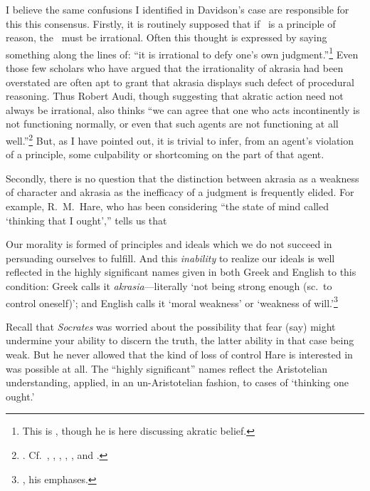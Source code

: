 \documentclass[11pt,letterpaper,oneside]{amsart}
\begin{document}
I believe the same confusions I identified in Davidson's case are responsible for this this consensus. Firstly, it is routinely supposed that if \enk\ is a principle of reason, the \ak\ must be irrational. Often this thought is expressed by saying something along the lines of: ``it is irrational to defy one's own judgment.''\footnote{This is \citet[pp.\ 242--3]{kolodny2007does}, though he is here discussing akratic belief.} Even those few scholars who have argued that the irrationality of akrasia had been overstated are often apt to grant that akrasia displays  such defect of procedural reasoning. Thus Robert Audi, though suggesting that akratic action need not always be irrational, also thinks ``we can agree that one who acts incontinently is not functioning normally, or even that such agents are not functioning at all well.''\footnote{\citet[p.\ 276]{audi1990weakness}. Cf.\ \citet{arpaly2000acting}, \citet{audi1990weakness}, \citet[pp.\ 188--90]{frankfurt1988rationality}, \citet{jones2003emotion}, \citet{mcintyre1990akratic, mcintyre2006wrong}, and \citet{tappolet2003emotions}.} But, as I have pointed out, it is  trivial to infer, from an agent's violation of a principle, some culpability or shortcoming on the part of that agent.



Secondly, there is no question that the distinction between akrasia as a weakness of character and akrasia as the inefficacy of a judgment is frequently elided. For example, R.\ M.\ Hare, who has been considering ``the state of mind called `thinking that I ought','' tells us that\begin{squote}Our morality is formed of principles and ideals which we do not succeed in persuading ourselves to fulfill. And this \emph{inability} to realize our ideals is well reflected in the highly significant names given in both Greek and English to this condition: Greek calls it \emph{akrasia}---literally `not being strong enough (sc.\ to control oneself)'; and English calls it `moral weakness' or `weakness of will.'\footnote{\citet[p.\ 77]{hare1963freedom}, his emphases.}\end{squote} Recall that \emph{Socrates} was worried about the possibility that fear (say) might undermine your ability to discern the truth, the latter ability in that case being weak. But he never allowed that the kind of loss of control Hare is interested in was possible at all. The ``highly significant'' names reflect the Aristotelian understanding, applied, in an un-Aristotelian fashion, to  cases of `thinking one ought.'
\end{document}
